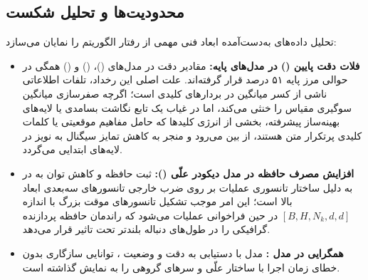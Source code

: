 \subsection{محدودیت‌ها و تحلیل شکست}
تحلیل داده‌های به‌دست‌آمده ابعاد فنی مهمی از رفتار الگوریتم را نمایان می‌سازد:
\begin{itemize}
    \item \textbf{فلات دقت پایین () در مدل‌های پایه:} مقادیر دقت در مدل‌های  ()،  () و  () همگی در حوالی مرز پایه ۵۱ درصد قرار گرفته‌اند. علت اصلی این رخداد، تلفات اطلاعاتی ناشی از کسر میانگین در بردارهای کلیدی است؛ اگرچه صفرسازی میانگین سوگیری مقیاس را خنثی می‌کند، اما در غیاب یک تابع نگاشت بسامدی یا لایه‌های بهینه‌ساز پیشرفته، بخشی از انرژی کلیدها که حامل مفاهیم موقعیتی یا کلمات کلیدی پرتکرار متن هستند، از بین می‌رود و منجر به کاهش تمایز سیگنال به نویز در لایه‌های ابتدایی می‌گردد.
    \item \textbf{افزایش مصرف حافظه در مدل دیکودر علّی ():} ثبت حافظه  و کاهش توان به  در  به دلیل ساختار تانسوری عملیات  بر روی ضرب خارجی تانسورهای سه‌بعدی ابعاد بالا است؛ این امر موجب تشکیل تانسورهای موقت بزرگ با اندازه $[B, H, N_k, d, d]$ در حین فراخوانی عملیات می‌شود که راندمان حافظه پردازنده گرافیکی را در طول‌های دنباله بلندتر تحت تاثیر قرار می‌دهد.
    \item \textbf{همگرایی در مدل :} مدل  با دستیابی به دقت  و وضعیت ، توانایی سازگاری بدون خطای زمان اجرا با ساختار علّی و سرهای گروهی را به نمایش گذاشته است.
\end{itemize}

